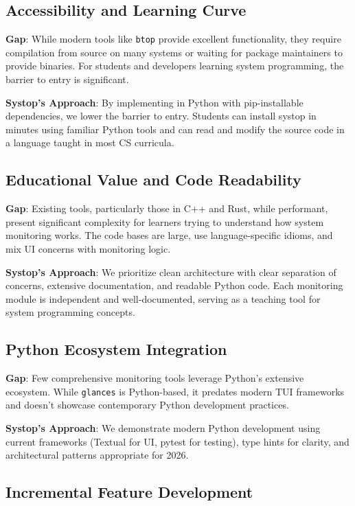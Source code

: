 \documentclass[12pt,a4paper,oneside]{report}
\begin{document}
\subsection{Accessibility and Learning Curve}

\textbf{Gap}: While modern tools like \texttt{btop} provide excellent functionality, they require compilation from source on many systems or waiting for package maintainers to provide binaries. For students and developers learning system programming, the barrier to entry is significant.

\textbf{Systop's Approach}: By implementing in Python with pip-installable dependencies, we lower the barrier to entry. Students can install systop in minutes using familiar Python tools and can read and modify the source code in a language taught in most CS curricula.

\subsection{Educational Value and Code Readability}

\textbf{Gap}: Existing tools, particularly those in C++ and Rust, while performant, present significant complexity for learners trying to understand how system monitoring works. The code bases are large, use language-specific idioms, and mix UI concerns with monitoring logic.

\textbf{Systop's Approach}: We prioritize clean architecture with clear separation of concerns, extensive documentation, and readable Python code. Each monitoring module is independent and well-documented, serving as a teaching tool for system programming concepts.

\subsection{Python Ecosystem Integration}

\textbf{Gap}: Few comprehensive monitoring tools leverage Python's extensive ecosystem. While \texttt{glances} is Python-based, it predates modern TUI frameworks and doesn't showcase contemporary Python development practices.

\textbf{Systop's Approach}: We demonstrate modern Python development using current frameworks (Textual for UI, pytest for testing), type hints for clarity, and architectural patterns appropriate for 2026.

\subsection{Incremental Feature Development}
\end{document}
